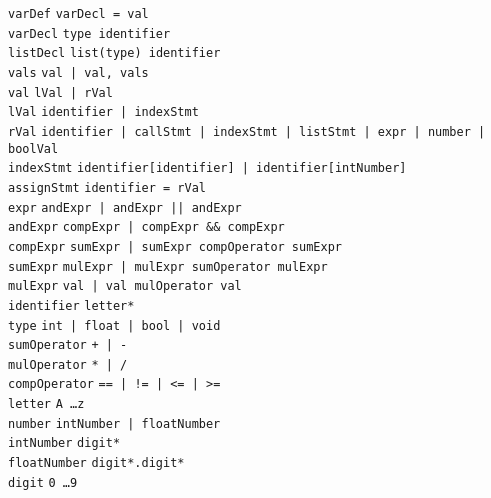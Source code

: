 \documentclass{article}
\newcommand{\keyword}[1]{\colorbox{light-gray}{\texttt{#1}}}
\newcommand{\code}[1]{\texttt{#1}}
\begin{document}
\code{varDef} \textrightarrow \code{varDecl \keyword{=} val} \\
\code{varDecl} \textrightarrow \code{type identifier} \\
\code{listDecl} \textrightarrow \code{\keyword{list(}type\keyword{)} identifier} \\
\code{vals} \textrightarrow \code{val | val, vals } \\
\code{val} \textrightarrow \code{lVal | rVal} \\
\code{lVal} \textrightarrow \code{identifier | indexStmt} \\
\code{rVal} \textrightarrow \code{identifier | callStmt | indexStmt | listStmt | expr | number | boolVal} \\
\code{indexStmt} \textrightarrow \code{identifier\keyword{[}identifier\keyword{]} | identifier\keyword{[}intNumber\keyword{]}} \\
\code{assignStmt} \textrightarrow \code{identifier \keyword{=} rVal} \\

\code{expr} \textrightarrow \code{andExpr | andExpr \keyword{||} andExpr} \\
\code{andExpr} \textrightarrow \code{compExpr | compExpr \keyword{\&\&} compExpr} \\
\code{compExpr} \textrightarrow \code{sumExpr | sumExpr compOperator sumExpr} \\
\code{sumExpr} \textrightarrow \code{mulExpr | mulExpr sumOperator mulExpr} \\
\code{mulExpr} \textrightarrow \code{val | val mulOperator val} \\

\code{identifier} \textrightarrow \code{letter*} \\
\code{type} \textrightarrow \code{\keyword{int} | \keyword{float} | \keyword{bool} | \keyword{void}} \\
\code{sumOperator} \textrightarrow \code{\keyword{+} | \keyword{-}} \\
\code{mulOperator} \textrightarrow \code{\keyword{*} | \keyword{/}} \\
\code{compOperator} \textrightarrow \code{\keyword{==} | \keyword{!=} | \keyword{<=} | \keyword{>=}} \\
\code{letter} \textrightarrow \code{\keyword{A} \ldots \keyword{z}} \\
\code{number} \textrightarrow \code{intNumber | floatNumber} \\
\code{intNumber} \textrightarrow \code{digit*} \\
\code{floatNumber} \textrightarrow \code{digit*.digit*} \\
\code{digit} \textrightarrow \code{\keyword{0} \ldots \keyword{9}} \\
\end{document}
